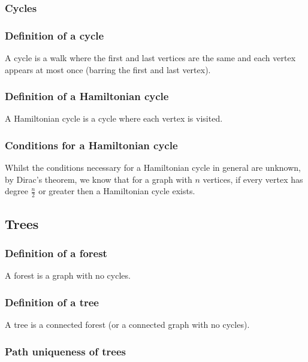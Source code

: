 \documentclass[a4paper, 12pt, twoside]{article}
\begin{document}
\subsubsection{Cycles}

\subsubsection{Definition of a cycle}

A cycle is a walk where the first and last vertices are the same
and each vertex appears at most once (barring the first and last
vertex).

\subsubsection{Definition of a Hamiltonian cycle}

A Hamiltonian cycle is a cycle where each vertex is visited.

\subsubsection{Conditions for a Hamiltonian cycle}

Whilst the conditions necessary for a Hamiltonian cycle in general
are unknown, by Dirac's theorem, we know that for a graph with
$n$ vertices, if every vertex has degree $\frac{n}{2}$ or greater
then a Hamiltonian cycle exists.

\subsection{Trees}

\subsubsection{Definition of a forest}

A forest is a graph with no cycles.

\subsubsection{Definition of a tree}

A tree is a connected forest (or a connected graph with no cycles).

\subsubsection{Path uniqueness of trees}
\end{document}
